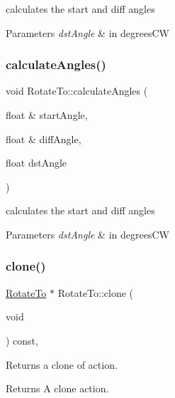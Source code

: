 calculates the start and diff angles 
\begin{DoxyParams}{Parameters}
{\em dst\+Angle} & in degrees\+CW \\
\hline
\end{DoxyParams}
\mbox{\label{classRotateTo_a1f92283615886e098e6b755f3e520ee3}} 
\subsubsection{\texorpdfstring{calculate\+Angles()}{calculateAngles()}\hspace{0.1cm}{\footnotesize\ttfamily [2/2]}}
{\footnotesize\ttfamily void Rotate\+To\+::calculate\+Angles (\begin{DoxyParamCaption}\item[{float \&}]{start\+Angle,  }\item[{float \&}]{diff\+Angle,  }\item[{float}]{dst\+Angle }\end{DoxyParamCaption})}

calculates the start and diff angles 
\begin{DoxyParams}{Parameters}
{\em dst\+Angle} & in degrees\+CW \\
\hline
\end{DoxyParams}
\mbox{\label{classRotateTo_aa9e32e5c6c1975c40e55a7f29a11a082}} 
\subsubsection{\texorpdfstring{clone()}{clone()}\hspace{0.1cm}{\footnotesize\ttfamily [1/2]}}
{\footnotesize\ttfamily \hyperlink{classRotateTo}{Rotate\+To} $\ast$ Rotate\+To\+::clone (\begin{DoxyParamCaption}\item[{void}]{ }\end{DoxyParamCaption}) const\hspace{0.3cm}{\ttfamily [override]}, {\ttfamily [virtual]}}

Returns a clone of action.

\begin{DoxyReturn}{Returns}
A clone action. 
\end{DoxyReturn}



